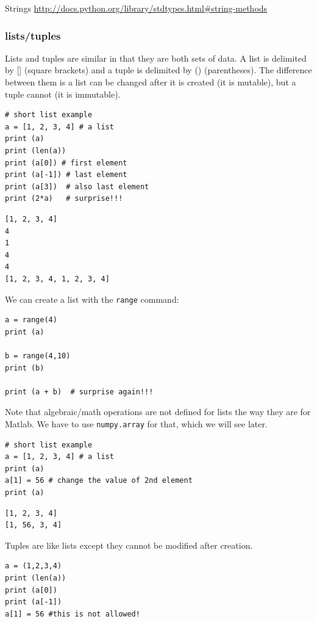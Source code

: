 \documentclass[11pt]{article}
\begin{document}
Strings \url{http://docs.python.org/library/stdtypes.html\#string-methods}


\subsubsection{lists/tuples}
\label{sec:org316883e}

Lists and tuples are similar in that they are both sets of data. A list is delimited by [] (square brackets) and a tuple is delimited by () (parentheses). The difference between them is a list can be changed after it is created (it is mutable), but a tuple cannot (it is immutable).

\begin{verbatim}
# short list example
a = [1, 2, 3, 4] # a list
print (a)
print (len(a))
print (a[0]) # first element
print (a[-1]) # last element
print (a[3])  # also last element
print (2*a)   # surprise!!!
\end{verbatim}

\begin{verbatim}
[1, 2, 3, 4]
4
1
4
4
[1, 2, 3, 4, 1, 2, 3, 4]
\end{verbatim}

We can create a list with the \texttt{range} command:

\begin{verbatim}
a = range(4)
print (a)

b = range(4,10)
print (b)

print (a + b)  # surprise again!!!
\end{verbatim}

Note that algebraic/math operations are not defined for lists the way they are for Matlab. We have to use \texttt{numpy.array} for that, which we will see later.

\begin{verbatim}
# short list example
a = [1, 2, 3, 4] # a list
print (a)
a[1] = 56 # change the value of 2nd element
print (a)
\end{verbatim}

\begin{verbatim}
[1, 2, 3, 4]
[1, 56, 3, 4]
\end{verbatim}

Tuples are like lists except they cannot be modified after creation.

\begin{verbatim}
a = (1,2,3,4)
print (len(a))
print (a[0])
print (a[-1])
a[1] = 56 #this is not allowed!
\end{verbatim}
\end{document}
